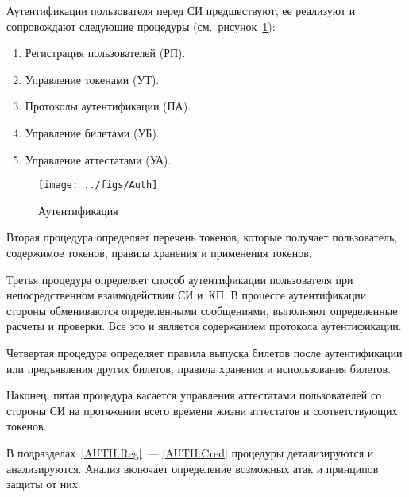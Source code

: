
Аутентификации пользователя перед СИ предшествуют, ее реализуют и сопровождают
следующие процедуры (см.~рисунок~\ref{Fig.AUTH.Auth}):
\begin{enumerate}
\item
Регистрация пользователей (РП).

\item
Управление токенами (УТ).

\item
Протоколы аутентификации (ПА).

\item
Управление билетами (УБ).

\item
Управление аттестатами (УА).
\end{enumerate}

\begin{figure}[bht]
\begin{center}
\texttt{[image: ../figs/Auth]}
\end{center}
\caption{Аутентификация}
\label{Fig.AUTH.Auth}
\end{figure}

Вторая процедура определяет перечень токенов, которые получает пользователь,
содержимое токенов, правила хранения и применения токенов.

Третья процедура определяет способ аутентификации пользователя 
при непосредственном взаимодействии СИ и~КП.
%
В процессе аутентификации стороны обмениваются 
определенными сообщениями, выполняют определенные расчеты и проверки.
%
Все это и является содержанием протокола аутентификации.

Четвертая процедура определяет правила выпуска билетов после 
аутентификации или предъявления других билетов, 
правила хранения и использования билетов. 

Наконец, пятая процедура касается управления аттестатами 
пользователей со стороны СИ на протяжении всего времени 
жизни аттестатов и соответствующих токенов.

В подразделах~\ref{AUTH.Reg}~--- \ref{AUTH.Cred} процедуры 
детализируются и анализируются. Анализ включает определение 
возможных атак и принципов защиты от них.
\fi